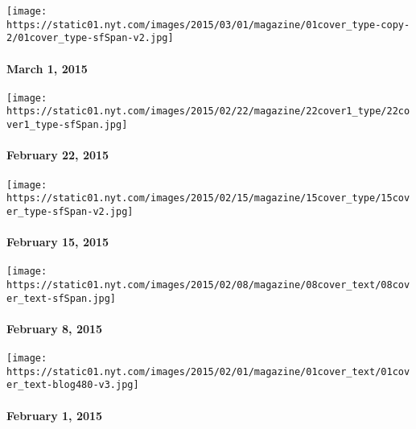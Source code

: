 \href{http://www.nytimes.com/indexes/2015/03/01/magazine/index.html}{}

\texttt{[image: https://static01.nyt.com/images/2015/03/01/magazine/01cover\_type-copy-2/01cover\_type-sfSpan-v2.jpg]}

\hypertarget{march-1-2015}{%
\paragraph{March 1, 2015}\label{march-1-2015}}

\href{http://www.nytimes.com/indexes/2015/02/22/magazine/index.html}{}

\texttt{[image: https://static01.nyt.com/images/2015/02/22/magazine/22cover1\_type/22cover1\_type-sfSpan.jpg]}

\hypertarget{february-22-2015}{%
\paragraph{February 22, 2015}\label{february-22-2015}}

\href{http://www.nytimes.com/indexes/2015/02/15/magazine/index.html}{}

\texttt{[image: https://static01.nyt.com/images/2015/02/15/magazine/15cover\_type/15cover\_type-sfSpan-v2.jpg]}

\hypertarget{february-15-2015}{%
\paragraph{February 15, 2015}\label{february-15-2015}}

\href{http://www.nytimes.com/indexes/2015/02/08/magazine/index.html}{}

\texttt{[image: https://static01.nyt.com/images/2015/02/08/magazine/08cover\_text/08cover\_text-sfSpan.jpg]}

\hypertarget{february-8-2015}{%
\paragraph{February 8, 2015}\label{february-8-2015}}

\href{http://www.nytimes.com/indexes/2015/02/01/magazine/index.html}{}

\texttt{[image: https://static01.nyt.com/images/2015/02/01/magazine/01cover\_text/01cover\_text-blog480-v3.jpg]}

\hypertarget{february-1-2015}{%
\paragraph{February 1, 2015}\label{february-1-2015}}

